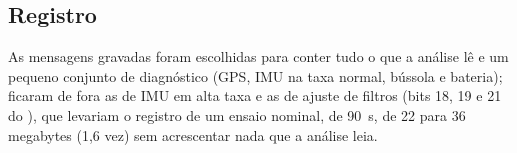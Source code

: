 \subsection{Registro}

As mensagens gravadas foram escolhidas para conter
tudo o que a análise lê e um pequeno conjunto de diagnóstico (GPS, IMU na
taxa normal, bússola e bateria); ficaram de fora as de IMU em alta taxa e as
de ajuste de filtros (bits 18, 19 e 21 do ), que
levariam o registro de um ensaio nominal, de \SI{90}{\second}, de 22 para 36
megabytes (1,6 vez) sem acrescentar nada que a análise leia.
